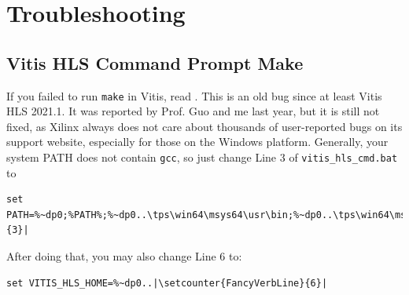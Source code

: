 \documentclass[a4paper,12pt,twoside]{article}
\begin{document}
\newpage
\section{Troubleshooting}
\subsection{Vitis HLS Command Prompt Make}\label{AMake}
If you failed to run \texttt{make} in Vitis, read \cite{make}. This is an old bug since at least Vitis HLS 2021.1. It was reported by Prof. Guo and me last year, but it is still not fixed, as Xilinx always does not care about thousands of user-reported bugs on its support website, especially for those on the Windows platform. Generally, your system PATH does not contain \texttt{gcc}, so just change Line 3 of \texttt{vitis\_hls\_cmd.bat} to
\begin{verbatim}
set PATH=%~dp0;%PATH%;%~dp0..\tps\win64\msys64\usr\bin;%~dp0..\tps\win64\msys64\mingw64\bin|\setcounter{FancyVerbLine}{3}|
\end{verbatim}
After doing that, you may also change Line 6 to:
\begin{verbatim}
set VITIS_HLS_HOME=%~dp0..|\setcounter{FancyVerbLine}{6}|
\end{verbatim}
\end{document}
